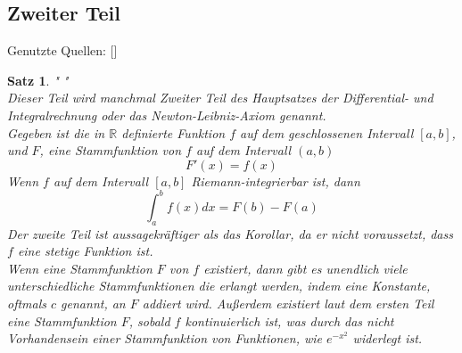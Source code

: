 \documentclass[fontsize=12pt,paper=a4,DIV12,cleardoublepage=empty, 
liststotoc,idxtotoc,bibtotoc]{article}
\newcommand{\RR}{\mathbb{R}}
\theoremstyle{plain}
\newtheorem{satz}{Satz}[subsection]
\theoremstyle{definition}
\begin{document}
	
	\subsection{Zweiter Teil}
	Genutzte Quellen: [\cite[vgl.]{SPM}]
	\begin{satz}" "\\
	Dieser Teil wird manchmal Zweiter Teil des Hauptsatzes der Differential- und Integralrechnung oder das Newton-Leibniz-Axiom genannt.\\
	Gegeben ist die in $\RR$ definierte Funktion $f$ auf dem geschlossenen Intervall $[a, b]$, und $F$, eine Stammfunktion von $f$ auf dem Intervall $(a, b)$
	\begin{equation*}
		F'(x)=f(x)
	\end{equation*}
	Wenn $f$ auf dem Intervall $[a, b]$ Riemann-integrierbar ist, dann 
	\begin{equation*}
		\int_{a}^{b}f(x)dx=F(b)-F(a)
	\end{equation*}
	Der zweite Teil ist aussagekräftiger als das Korollar, da er nicht voraussetzt, dass $f$ eine stetige Funktion ist.\\
	Wenn eine Stammfunktion $F$ von $f$ existiert, dann gibt es unendlich viele unterschiedliche Stammfunktionen die erlangt werden, indem eine Konstante, oftmals $c$ genannt, an $F$ addiert wird. Außerdem existiert laut dem ersten Teil eine Stammfunktion $F$, sobald $f$ kontinuierlich ist, was durch das nicht Vorhandensein einer Stammfunktion von Funktionen, wie $e^{-x^2}$ widerlegt ist.
	
	\end{satz}	
	
\end{document}

